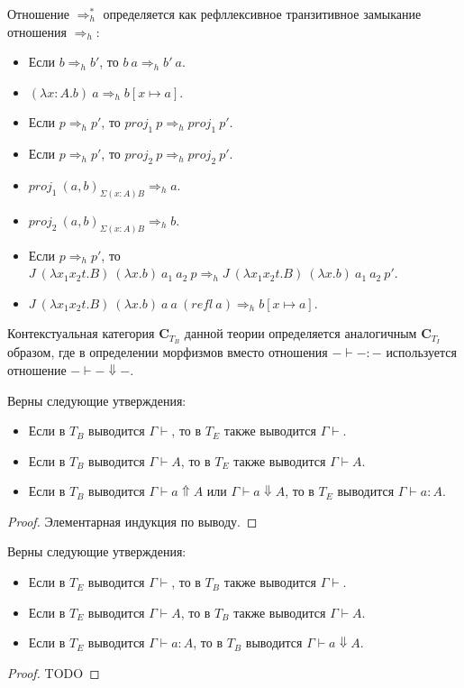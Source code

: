 \documentclass{amsart}
\theoremstyle{definition}
\theoremstyle{remark}
\newcommand{\red}{\Rightarrow}
\newcommand{\cat}[1]{\mathbf{#1}}
\renewcommand{\C}{\cat{C}}
\numberwithin{figure}{section}
\begin{document}
Отношение $\red^*_h$ определяется как рефллексивное транзитивное замыкание отношения $\red_h$:
\begin{itemize}
\item Если $b \red_h b'$, то $b\ a \red_h b'\ a$.
\item $(\lambda x : A. b)\ a \red_h b[x \mapsto a]$.
\item Если $p \red_h p'$, то $proj_1\ p \red_h proj_1\ p'$.
\item Если $p \red_h p'$, то $proj_2\ p \red_h proj_2\ p'$.
\item $proj_1\ (a, b)_{\Sigma (x : A) B} \red_h a$.
\item $proj_2\ (a, b)_{\Sigma (x : A) B} \red_h b$.
\item Если $p \red_h p'$, то $J\ (\lambda x_1 x_2 t. B)\ (\lambda x. b)\ a_1\ a_2\ p \red_h J\ (\lambda x_1 x_2 t. B)\ (\lambda x. b)\ a_1\ a_2\ p'$.
\item $J\ (\lambda x_1 x_2 t. B)\ (\lambda x. b)\ a\ a\ (refl\ a) \red_h b[x \mapsto a]$.
\end{itemize}

Контекстуальная категория $\C_{T_B}$ данной теории определяется аналогичным $\C_{T_I}$ образом, где в определении морфизмов вместо отношения $- \vdash - : -$ используется отношение $- \vdash - \Downarrow -$.

\begin{prop}
Верны следующие утверждения:
\begin{itemize}
\item Если в $T_B$ выводится $\Gamma \vdash$, то в $T_E$ также выводится $\Gamma \vdash$.
\item Если в $T_B$ выводится $\Gamma \vdash A$, то в $T_E$ также выводится $\Gamma \vdash A$.
\item Если в $T_B$ выводится $\Gamma \vdash a \Uparrow A$ или $\Gamma \vdash a \Downarrow A$, то в $T_E$ выводится $\Gamma \vdash a : A$.
\end{itemize}
\end{prop}
\begin{proof}
Элементарная индукция по выводу.
\end{proof}

\begin{prop}
Верны следующие утверждения:
\begin{itemize}
\item Если в $T_E$ выводится $\Gamma \vdash$, то в $T_B$ также выводится $\Gamma \vdash$.
\item Если в $T_E$ выводится $\Gamma \vdash A$, то в $T_B$ также выводится $\Gamma \vdash A$.
\item Если в $T_E$ выводится $\Gamma \vdash a : A$, то в $T_B$ выводится $\Gamma \vdash a \Downarrow A$.
\end{itemize}
\end{prop}
\begin{proof}
TODO
\end{proof}
\end{document}
